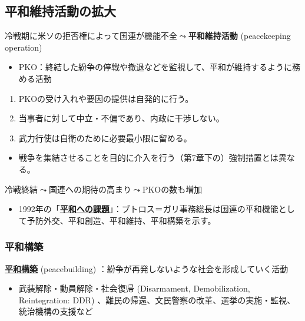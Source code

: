 \documentclass[
  xelatex,
  ja=standard]{bxjsarticle}
\providecommand{\tightlist}{%
  \setlength{\itemsep}{0pt}\setlength{\parskip}{0pt}}\usepackage{longtable,booktabs,array}
\begin{document}
\hypertarget{ux5e73ux548cux7dadux6301ux6d3bux52d5ux306eux62e1ux5927}{%
\subsection{平和維持活動の拡大}\label{ux5e73ux548cux7dadux6301ux6d3bux52d5ux306eux62e1ux5927}}

冷戦期に米ソの拒否権によって国連が機能不全\(\leadsto\)\textbf{平和維持活動}
(peacekeeping operation)

\begin{itemize}
\tightlist
\item
  PKO：終結した紛争の停戦や撤退などを監視して、平和が維持するように務める活動
\end{itemize}

\begin{enumerate}
\def\labelenumi{\arabic{enumi}.}
\tightlist
\item
  PKOの受け入れや要因の提供は自発的に行う。
\item
  当事者に対して中立・不偏であり、内政に干渉しない。\\
\item
  武力行使は自衛のために必要最小限に留める。
\end{enumerate}

\begin{itemize}
\tightlist
\item
  戦争を集結させることを目的に介入を行う（第7章下の）強制措置とは異なる。
\end{itemize}

冷戦終結\(\leadsto\)国連への期待の高まり\(\leadsto\)PKOの数も増加

\begin{itemize}
\tightlist
\item
  1992年の「\href{https://www.unic.or.jp/files/peace.pdf}{\textbf{平和への課題}}」：ブトロス＝ガリ事務総長は国連の平和機能として予防外交、平和創造、平和維持、平和構築を示す。
\end{itemize}

\hypertarget{ux5e73ux548cux69cbux7bc9}{%
\subsubsection{平和構築}\label{ux5e73ux548cux69cbux7bc9}}

\href{https://www.mofa.go.jp/mofaj/gaiko/peace_b/index.html}{\textbf{平和構築}}
(peacebuilding) ：紛争が再発しないような社会を形成していく活動

\begin{itemize}
\tightlist
\item
  武装解除・動員解除・社会復帰 (Disarmament, Demobilization,
  Reintegration: DDR)
  、難民の帰還、文民警察の改革、選挙の実施・監視、統治機構の支援など
\end{itemize}
\end{document}
